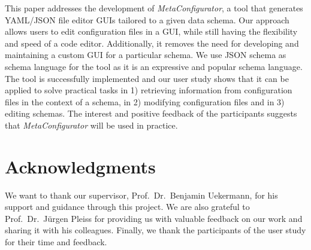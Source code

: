 \documentclass[lettersize,journal]{IEEEtran}
\newcommand{\cfgfiles}{configuration files}
\newcommand{\toolname}{\textit{MetaConfigurator}}
\begin{document}
 This paper addresses the development of \toolname{}, a tool that generates YAML/JSON file editor GUIs tailored to a given data schema.
Our approach allows users to edit \cfgfiles{} in a GUI, while still having the flexibility and speed of a code editor.
Additionally, it removes the need for developing and maintaining a custom GUI for a particular schema.
We use JSON schema as schema language for the tool as it is an expressive and popular schema language.
The tool is successfully implemented and our user study shows that it can be applied to solve practical tasks in 1) retrieving information from \cfgfiles{} in the context of a schema, in 2) modifying \cfgfiles{} and in 3) editing schemas.
The interest and positive feedback of the participants suggests that \toolname{} will be used in practice.






\section*{Acknowledgments}
We want to thank our supervisor, Prof.\ Dr.\ Benjamin Uekermann, for his support and guidance through this project.
We are also grateful to Prof.\ Dr.\ Jürgen Pleiss for providing us with valuable feedback on our work and sharing it with his colleagues.
Finally, we thank the participants of the user study for their time and feedback.
\end{document}
